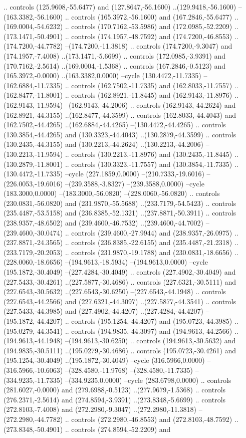 \begin{scope}[shift={(55,258)}]
.. controls (125.9608,-55.6477) and (127.8647,-56.1600) ..(129.9418,-56.1600) --(163.3382,-56.1600) .. controls (165.3972,-56.1600) and (167.2846,-55.6477) ..(169.0004,-54.6232) .. controls (170.7162,-53.5986) and (172.0985,-52.2209) ..(173.1471,-50.4901) .. controls (174.1957,-48.7592) and (174.7200,-46.8553) ..(174.7200,-44.7782) --(174.7200,-11.3818) .. controls (174.7200,-9.3047) and (174.1957,-7.4008) ..(173.1471,-5.6699) .. controls (172.0985,-3.9391) and (170.7162,-2.5614) ..(169.0004,-1.5368) .. controls (167.2846,-0.5123) and (165.3972,-0.0000) ..(163.3382,0.0000) --cycle (130.4472,-11.7335) --(162.6884,-11.7335) .. controls (162.7502,-11.7335) and (162.8033,-11.7557) ..(162.8477,-11.8001) .. controls (162.8921,-11.8445) and (162.9143,-11.8976) ..(162.9143,-11.9594) --(162.9143,-44.2006) .. controls (162.9143,-44.2624) and (162.8921,-44.3155) ..(162.8477,-44.3599) .. controls (162.8033,-44.4043) and (162.7502,-44.4265) ..(162.6884,-44.4265) --(130.4472,-44.4265) .. controls (130.3854,-44.4265) and (130.3323,-44.4043) ..(130.2879,-44.3599) .. controls (130.2435,-44.3155) and (130.2213,-44.2624) ..(130.2213,-44.2006) --(130.2213,-11.9594) .. controls (130.2213,-11.8976) and (130.2435,-11.8445) ..(130.2879,-11.8001) .. controls (130.3323,-11.7557) and (130.3854,-11.7335) ..(130.4472,-11.7335) --cycle (227.1859,0.0000) --(210.7333,-19.6016) --(226.0053,-19.6016) --(239.3588,-3.8327) --(239.3588,0.0000) --cycle (183.3000,0.0000) --(183.3000,-56.0820) --(228.0060,-56.0820) .. controls (230.0831,-56.0820) and (231.9870,-55.5688) ..(233.7179,-54.5423) .. controls (235.4487,-53.5158) and (236.8385,-52.1321) ..(237.8871,-50.3911) .. controls (238.9357,-48.6502) and (239.4600,-46.7532) ..(239.4600,-44.7002) --(239.4600,-30.0474) .. controls (239.4600,-27.9944) and (238.9357,-26.0975) ..(237.8871,-24.3565) .. controls (236.8385,-22.6155) and (235.4487,-21.2318) ..(233.7179,-20.2053) .. controls (231.9870,-19.1788) and (230.0831,-18.6656) ..(228.0060,-18.6656) --(194.9613,-18.5934) --(194.9613,0.0000) --cycle (195.1872,-30.4049) --(227.4284,-30.4049) .. controls (227.4902,-30.4049) and (227.5433,-30.4261) ..(227.5877,-30.4686) .. controls (227.6321,-30.5111) and (227.6543,-30.5632) ..(227.6543,-30.6250) --(227.6543,-44.1948) .. controls (227.6543,-44.2566) and (227.6321,-44.3097) ..(227.5877,-44.3541) .. controls (227.5433,-44.3985) and (227.4902,-44.4207) ..(227.4284,-44.4207) --(195.1872,-44.4207) .. controls (195.1254,-44.4207) and (195.0723,-44.3985) ..(195.0279,-44.3541) .. controls (194.9835,-44.3097) and (194.9613,-44.2566) ..(194.9613,-44.1948) --(194.9613,-30.6250) .. controls (194.9613,-30.5632) and (194.9835,-30.5111) ..(195.0279,-30.4686) .. controls (195.0723,-30.4261) and (195.1254,-30.4049) ..(195.1872,-30.4049) --cycle (316.5966,0.0000) --(316.5966,-10.6063) --(328.4580,-11.9768) --(328.4580,-11.7335) --(334.9235,-11.7335) --(334.9235,0.0000) --cycle (283.6798,0.0000) .. controls (281.6027,-0.0000) and (279.6988,-0.5123) ..(277.9679,-1.5368) .. controls (276.2371,-2.5614) and (274.8594,-3.9391) ..(273.8348,-5.6699) .. controls (272.8103,-7.4008) and (272.2980,-9.3047) ..(272.2980,-11.3818) --(272.2980,-44.7782) .. controls (272.2980,-46.8553) and (272.8103,-48.7592) ..(273.8348,-50.4901) .. controls (274.8594,-52.2209) and 
\end{scope}
